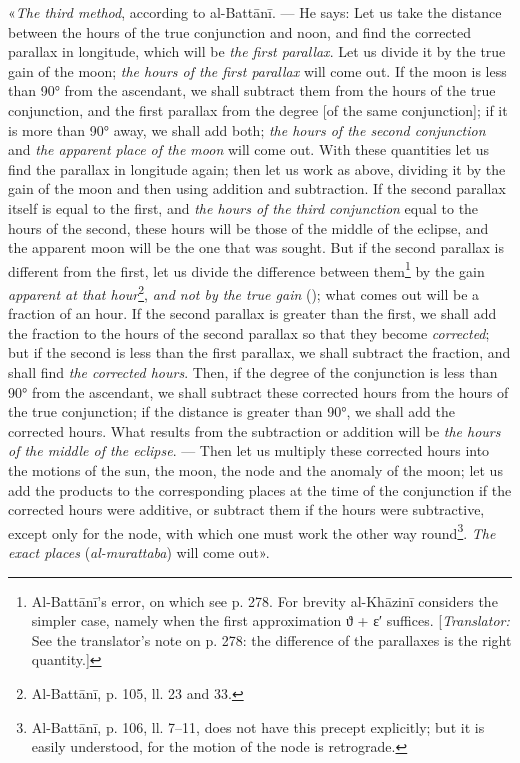 \documentclass[11pt]{article}
\newcommand{\Pg}[1]{\marginpar{\footnotesize\color{gray}#1}}
\begin{document}
\par \Pg{I 281}«\emph{The third method}, according to al-Battānī. — He says: Let us take the distance between the hours of the true conjunction and noon, and find the corrected parallax in longitude, which will be \emph{the first parallax}. Let us divide it by the true gain of the moon; \emph{the hours of the first parallax} will come out. If the moon is less than 90° from the ascendant, we shall subtract them from the hours of the true conjunction, and the first parallax from the degree [of the same conjunction]; if it is more than 90° away, we shall add both; \emph{the hours of the second conjunction} and \emph{the apparent place of the moon} will come out. With these quantities let us find the parallax in longitude again; then let us work as above, dividing it by the gain of the moon and then using addition and subtraction. If the second parallax itself is equal to the first, and \emph{the hours of the third conjunction} equal to the hours of the second, these hours will be those of the middle of the eclipse, and the apparent moon will be the one that was sought. But if the second parallax is different from the first, let us divide the difference between them\footnote{Al-Battānī's error, on which see p. 278. For brevity al-Khāzinī considers the simpler case, namely when the first approximation {\greekfont ϑ} + {\greekfont ε}′ suffices. [\emph{Translator:} See the translator's note on p. 278: the difference of the parallaxes is the right quantity.]} by the gain \emph{apparent at that hour}\footnote{Al-Battānī, p. 105, ll. 23 and 33.}, \emph{and not by the true gain} (); what comes out will be a fraction of an hour. If the second parallax is greater than the first, we shall add the fraction to the hours of the second parallax so that they become \emph{corrected}; but if the second is less than the first parallax, we shall subtract the fraction, and shall find \emph{the corrected hours}. Then, if the degree of the conjunction is less than 90° from the ascendant, we shall subtract these corrected hours from the hours of the true conjunction; if the distance is greater than 90°, we shall add the corrected hours. What results from the subtraction or addition will be \emph{the hours of the middle of the eclipse}. — Then let us multiply these corrected hours into the motions of the sun, the moon, the node and the anomaly of the moon; let us add the products to the corresponding places at the time of the conjunction if the corrected hours were additive, or subtract them if the hours were subtractive, except only for the node, with which one must work the other way round\footnote{Al-Battānī, p. 106, ll. 7–11, does not have this precept explicitly; but it is easily understood, for the motion of the node is retrograde.}. \emph{The exact places} (\emph{al-murattaba}) will come out».\par
\end{document}
